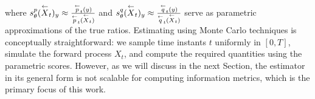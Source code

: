 where \( s^p_\theta(\overset{\leftarrow}{X}_t)_y \approx \frac{\overset{\leftarrow}{p}_t(y)}{\overset{\leftarrow}{p}_t(\overset{\leftarrow}{X}_t)} \) and \( s^q_\theta(\overset{\leftarrow}{X}_t)_y\approx\frac{\overset{\leftarrow}{q}_t(y)}{\overset{\leftarrow}{q}_t(\overset{\leftarrow}{X}_t)} \) serve as parametric approximations of the true ratios. Estimating  using Monte Carlo techniques is conceptually straightforward: we sample time instants \( t \) uniformly in \( [0,T] \), simulate the forward process \( X_t \), and compute the required quantities using the parametric scores. However, as we will discuss in the next Section, the estimator in its general form is not scalable for computing information metrics, which is the primary focus of this work.
